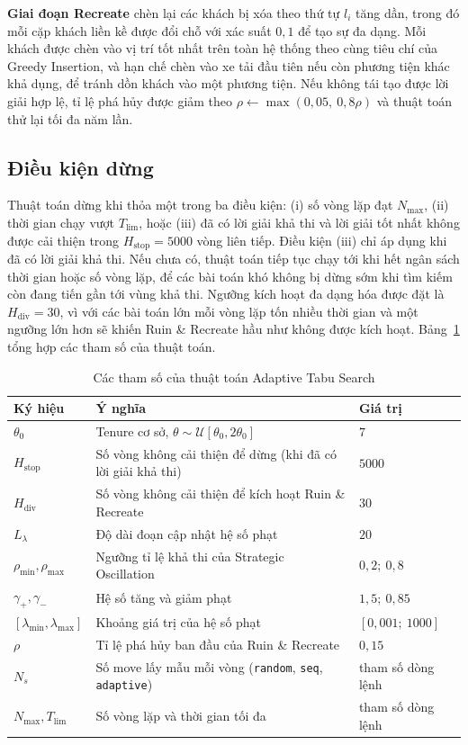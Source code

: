 \documentclass[../DoAn.tex]{subfiles}
\begin{document}
\textbf{Giai đoạn Recreate} chèn lại các khách bị xóa theo thứ tự $l_i$ tăng dần, trong đó mỗi cặp khách liền kề được đổi chỗ với xác suất $0{,}1$ để tạo sự đa dạng. Mỗi khách được chèn vào vị trí tốt nhất trên toàn hệ thống theo cùng tiêu chí của Greedy Insertion, và hạn chế chèn vào xe tải đầu tiên nếu còn phương tiện khác khả dụng, để tránh dồn khách vào một phương tiện. Nếu không tái tạo được lời giải hợp lệ, tỉ lệ phá hủy được giảm theo $\rho \leftarrow \max(0{,}05,\ 0{,}8\rho)$ và thuật toán thử lại tối đa năm lần.

\subsection{Điều kiện dừng}

Thuật toán dừng khi thỏa một trong ba điều kiện: (i) số vòng lặp đạt $N_{\max}$, (ii) thời gian chạy vượt $T_{\text{lim}}$, hoặc (iii) đã có lời giải khả thi và lời giải tốt nhất không được cải thiện trong $H_{\text{stop}} = 5000$ vòng liên tiếp. Điều kiện (iii) chỉ áp dụng khi đã có lời giải khả thi. Nếu chưa có, thuật toán tiếp tục chạy tới khi hết ngân sách thời gian hoặc số vòng lặp, để các bài toán khó không bị dừng sớm khi tìm kiếm còn đang tiến gần tới vùng khả thi. Ngưỡng kích hoạt đa dạng hóa được đặt là $H_{\text{div}} = 30$, vì với các bài toán lớn mỗi vòng lặp tốn nhiều thời gian và một ngưỡng lớn hơn sẽ khiến Ruin \& Recreate hầu như không được kích hoạt. Bảng~\ref{tab:params} tổng hợp các tham số của thuật toán.

\begin{table}[H]
\centering
\caption{Các tham số của thuật toán Adaptive Tabu Search}
\label{tab:params}
\begin{tabular}{lll}
\toprule
\textbf{Ký hiệu} & \textbf{Ý nghĩa} & \textbf{Giá trị} \\
\midrule
$\theta_0$ & Tenure cơ sở, $\theta \sim \mathcal{U}[\theta_0, 2\theta_0]$ & $7$ \\
$H_{\text{stop}}$ & Số vòng không cải thiện để dừng (khi đã có lời giải khả thi) & $5000$ \\
$H_{\text{div}}$ & Số vòng không cải thiện để kích hoạt Ruin \& Recreate & $30$ \\
$L_\lambda$ & Độ dài đoạn cập nhật hệ số phạt & $20$ \\
$\rho_{\min}, \rho_{\max}$ & Ngưỡng tỉ lệ khả thi của Strategic Oscillation & $0{,}2;\ 0{,}8$ \\
$\gamma_+, \gamma_-$ & Hệ số tăng và giảm phạt & $1{,}5;\ 0{,}85$ \\
$[\lambda_{\min}, \lambda_{\max}]$ & Khoảng giá trị của hệ số phạt & $[0{,}001;\ 1000]$ \\
$\rho$ & Tỉ lệ phá hủy ban đầu của Ruin \& Recreate & $0{,}15$ \\
$N_s$ & Số move lấy mẫu mỗi vòng (\texttt{random}, \texttt{seq}, \texttt{adaptive}) & tham số dòng lệnh \\
$N_{\max}, T_{\text{lim}}$ & Số vòng lặp và thời gian tối đa & tham số dòng lệnh \\
\bottomrule
\end{tabular}
\end{table}
\end{document}
